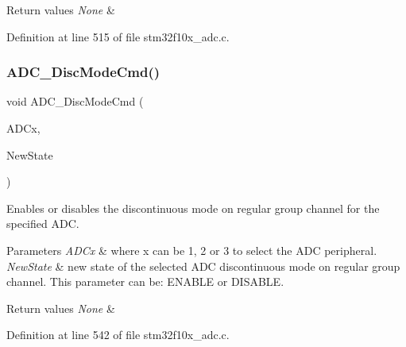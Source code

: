\begin{DoxyRetVals}{Return values}
{\em None} & \\
\hline
\end{DoxyRetVals}


Definition at line 515 of file stm32f10x\+\_\+adc.\+c.

\mbox{\label{group___a_d_c___exported___functions_ga1909649d10253ce88d986ffbb94a4be6}} 
\subsubsection{\texorpdfstring{A\+D\+C\+\_\+\+Disc\+Mode\+Cmd()}{ADC\_DiscModeCmd()}}
{\footnotesize\ttfamily void A\+D\+C\+\_\+\+Disc\+Mode\+Cmd (\begin{DoxyParamCaption}\item[{\hyperlink{struct_a_d_c___type_def}{A\+D\+C\+\_\+\+Type\+Def} $\ast$}]{A\+D\+Cx,  }\item[{\hyperlink{group___exported__types_gac9a7e9a35d2513ec15c3b537aaa4fba1}{Functional\+State}}]{New\+State }\end{DoxyParamCaption})}



Enables or disables the discontinuous mode on regular group channel for the specified A\+DC. 


\begin{DoxyParams}{Parameters}
{\em A\+D\+Cx} & where x can be 1, 2 or 3 to select the A\+DC peripheral. \\
\hline
{\em New\+State} & new state of the selected A\+DC discontinuous mode on regular group channel. This parameter can be\+: E\+N\+A\+B\+LE or D\+I\+S\+A\+B\+LE. \\
\hline
\end{DoxyParams}

\begin{DoxyRetVals}{Return values}
{\em None} & \\
\hline
\end{DoxyRetVals}


Definition at line 542 of file stm32f10x\+\_\+adc.\+c.

\mbox{\label{group___a_d_c___exported___functions_gac5881d5995818001584b27b137a8dbcb}} 

